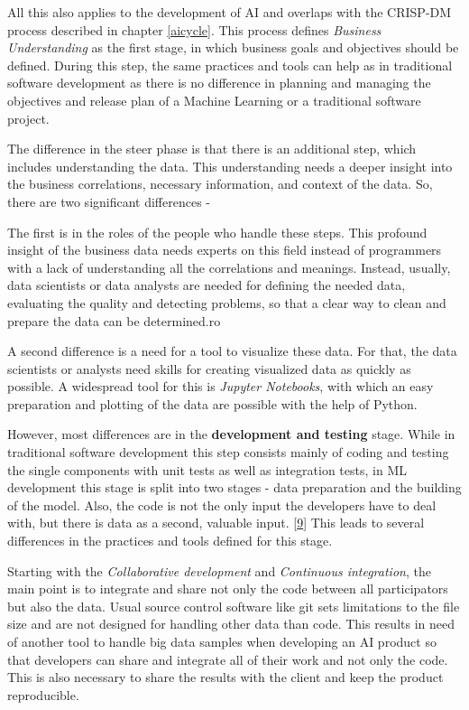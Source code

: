 \documentclass[12pt,english,a4paper,oneside,,tablecaptionabove]{scrbook}
\begin{document}
All this also applies to the development of AI and overlaps with the
CRISP-DM process described in chapter \ref{aicycle}. This process
defines \emph{Business Understanding} as the first stage, in which
business goals and objectives should be defined. During this step, the
same practices and tools can help as in traditional software development
as there is no difference in planning and managing the objectives and
release plan of a Machine Learning or a traditional software project.

The difference in the steer phase is that there is an additional step,
which includes understanding the data. This understanding needs a deeper
insight into the business correlations, necessary information, and
context of the data. So, there are two significant differences -

The first is in the roles of the people who handle these steps. This
profound insight of the business data needs experts on this field
instead of programmers with a lack of understanding all the correlations
and meanings. Instead, usually, data scientists or data analysts are
needed for defining the needed data, evaluating the quality and
detecting problems, so that a clear way to clean and prepare the data
can be determined.ro

A second difference is a need for a tool to visualize these data. For
that, the data scientists or analysts need skills for creating
visualized data as quickly as possible. A widespread tool for this is
\emph{Jupyter Notebooks}, with which an easy preparation and plotting of
the data are possible with the help of Python.

However, most differences are in the \textbf{development and testing}
stage. While in traditional software development this step consists
mainly of coding and testing the single components with unit tests as
well as integration tests, in ML development this stage is split into
two stages - data preparation and the building of the model. Also, the
code is not the only input the developers have to deal with, but there
is data as a second, valuable input.
{[}\protect\hyperlink{ref-Dillon}{9}{]} This leads to several
differences in the practices and tools defined for this stage.

Starting with the \emph{Collaborative development} and \emph{Continuous
integration}, the main point is to integrate and share not only the code
between all participators but also the data. Usual source control
software like git sets limitations to the file size and are not designed
for handling other data than code. This results in need of another tool
to handle big data samples when developing an AI product so that
developers can share and integrate all of their work and not only the
code. This is also necessary to share the results with the client and
keep the product reproducible.
\end{document}
